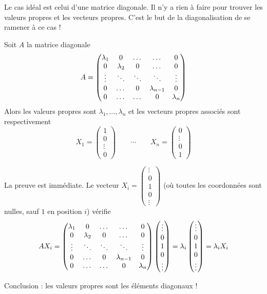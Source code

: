\documentclass[11pt, class=report,crop=false]{standalone}
\begin{document}
Le cas idéal est celui d'une matrice diagonale. Il n'y a rien à faire pour trouver les valeurs propres et les vecteurs propres. C'est le but de la \og{}diagonalisation\fg{} de se ramener à ce cas !  

\begin{exemple}
Soit $A$ la matrice diagonale 
$$A=\begin{pmatrix}
\lambda_{1}& 0& \dots &  \dots & 0\cr
0& \lambda_{2}& 0&  \dots &0\cr
\vdots & \ddots & \ddots & \ddots & \vdots \cr
0& \dots & 0 & \lambda_{n-1} & 0 \cr
0& \dots & \dots & 0 & \lambda_{n}\cr
\end{pmatrix}$$
Alors les valeurs propres sont $\lambda_1, \ldots,\lambda_n$ et les vecteurs propres associés sont respectivement
$$X_1 = \begin{pmatrix} 1 \\ 0 \\ \vdots \\ 0 \end{pmatrix} \qquad \cdots \qquad
X_n = \begin{pmatrix} 0 \\ \vdots \\ 0 \\ 1\end{pmatrix}$$

La preuve est immédiate. Le vecteur $X_i = \left(\begin{smallmatrix}\vdots\\0\\1\\0 \\\vdots\end{smallmatrix}\right) $ (où toutes les coordonnées sont nulles, sauf $1$ en position $i$) vérifie
$$AX_i = 
\begin{pmatrix}
\lambda_{1}& 0& \dots &  \dots & 0\cr
0& \lambda_{2}& 0&  \dots &0\cr
\vdots & \ddots & \ddots & \ddots & \vdots \cr
0& \dots & 0 & \lambda_{n-1} & 0 \cr
0& \dots & \dots & 0 & \lambda_{n}\cr
\end{pmatrix} 
\begin{pmatrix}
\vdots\\0\\1\\0 \\\vdots
\end{pmatrix}
= 
\lambda_i \begin{pmatrix}
\vdots\\0\\1\\0 \\\vdots
\end{pmatrix}
= \lambda_i X_i$$

Conclusion : les valeurs propres sont les éléments diagonaux !
\end{exemple} 
\end{document}
